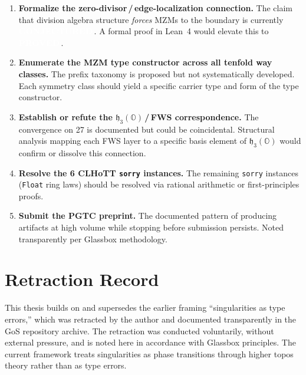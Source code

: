 \documentclass[11pt,letterpaper]{article}
\newcommand{\proved}{\texorpdfstring{\colorbox{proved}{\textcolor{white}{\scriptsize\textbf{\,PROVED\,}}}}{ [PROVED]}}
\newcommand{\conjectured}{\texorpdfstring{\colorbox{conjectured}{\textcolor{white}{\scriptsize\textbf{\,CONJECTURED\,}}}}{ [CONJECTURED]}}
\newcommand{\OO}{\mathbb{O}}
\newcommand{\hthreeO}{\mathfrak{h}_3(\OO)}
\begin{document}
\begin{enumerate}[label=\textbf{Q\arabic*.}, leftmargin=2.5em, itemsep=6pt]
  \item \textbf{Formalize the zero-divisor\,/\,edge-localization connection.} The claim that division algebra structure \emph{forces} MZMs to the boundary is currently \conjectured. A formal proof in Lean~4 would elevate this to \proved.

  \item \textbf{Enumerate the MZM type constructor across all tenfold way classes.} The prefix taxonomy is proposed but not systematically developed. Each symmetry class should yield a specific carrier type and form of the type constructor.

  \item \textbf{Establish or refute the $\hthreeO$\,/\,FWS correspondence.} The convergence on 27 is documented but could be coincidental. Structural analysis mapping each FWS layer to a specific basis element of $\hthreeO$ would confirm or dissolve this connection.

  \item \textbf{Resolve the 6 CLHoTT \texttt{sorry} instances.} The remaining \texttt{sorry} instances (\texttt{Float} ring laws) should be resolved via rational arithmetic or first-principles proofs.

  \item \textbf{Submit the PGTC preprint.} The documented pattern of producing artifacts at high volume while stopping before submission persists. Noted transparently per Glassbox methodology.
\end{enumerate}


\appendix

\section{Retraction Record}

This thesis builds on and supersedes the earlier framing ``singularities as type errors,'' which was retracted by the author and documented transparently in the GoS repository archive. The retraction was conducted voluntarily, without external pressure, and is noted here in accordance with Glassbox principles. The current framework treats singularities as phase transitions through higher topos theory rather than as type errors.
\end{document}
